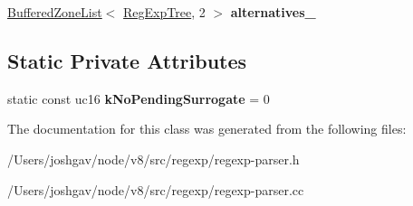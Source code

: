 \begin{DoxyCompactItemize}
\item 
\hyperlink{classv8_1_1internal_1_1_buffered_zone_list}{Buffered\+Zone\+List}$<$ \hyperlink{classv8_1_1internal_1_1_reg_exp_tree}{Reg\+Exp\+Tree}, 2 $>$ {\bfseries alternatives\+\_\+}\hypertarget{classv8_1_1internal_1_1_reg_exp_builder_a7ffc7cbd43478fd5ae9b5712cf027623}{}\label{classv8_1_1internal_1_1_reg_exp_builder_a7ffc7cbd43478fd5ae9b5712cf027623}

\end{DoxyCompactItemize}
\subsection*{Static Private Attributes}
\begin{DoxyCompactItemize}
\item 
static const uc16 {\bfseries k\+No\+Pending\+Surrogate} = 0\hypertarget{classv8_1_1internal_1_1_reg_exp_builder_a86e5fca1c56e59d54d9b060bdac6e313}{}\label{classv8_1_1internal_1_1_reg_exp_builder_a86e5fca1c56e59d54d9b060bdac6e313}

\end{DoxyCompactItemize}


The documentation for this class was generated from the following files\+:\begin{DoxyCompactItemize}
\item 
/\+Users/joshgav/node/v8/src/regexp/regexp-\/parser.\+h\item 
/\+Users/joshgav/node/v8/src/regexp/regexp-\/parser.\+cc\end{DoxyCompactItemize}
